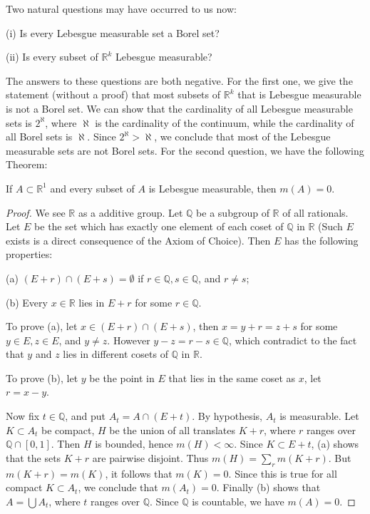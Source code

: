 Two natural questions may have occurred to us now:\par
(i) Is every Lebesgue measurable set a Borel set?\par
(ii) Is every subset of $\mathbb{R}^k$ Lebesgue measurable?\par
The answers to these questions are both negative. For the first one, we give the statement (without a proof) that most subsets of $\mathbb{R}^k$ that is Lebesgue measurable is not a Borel set. We can show that the cardinality of all Lebesgue measurable sets is $2^\aleph$, where $\aleph$ is the cardinality of the continuum, while the cardinality of all Borel sets is $\aleph$. Since $2^\aleph>\aleph$, we conclude that most of the Lebesgue measurable sets are not Borel sets. For the second question, we have the following Theorem:
\begin{theorem}
If $A\subset\mathbb{R}^1$ and every subset of $A$ is Lebesgue measurable, then $m(A)=0$.
\end{theorem}
\begin{proof}
We see $\mathbb{R}$ as a additive group. Let $\mathbb{Q}$ be a subgroup of $\mathbb{R}$ of all rationals. Let $E$ be the set which has exactly one element of each coset of $\mathbb{Q}$ in $\mathbb{R}$ (Such $E$ exists is a direct consequence of the Axiom of Choice). Then $E$ has the following properties:\par
(a) $(E+r)\cap(E+s)=\emptyset$ if $r\in\mathbb{Q},s\in\mathbb{Q}$, and $r\ne s$;\par
(b) Every $x\in\mathbb{R}$ lies in $E+r$ for some $r\in\mathbb{Q}$.\par
To prove (a), let $x\in(E+r)\cap(E+s)$, then $x=y+r=z+s$ for some $y\in E,z\in E$, and $y\ne z$. However $y-z=r-s\in\mathbb{Q}$, which contradict to the fact that $y$ and $z$ lies in different cosets of $\mathbb{Q}$ in $\mathbb{R}$.\par
To prove (b), let $y$ be the point in $E$ that lies in the same coset as $x$, let $r=x-y$.\par
Now fix $t\in\mathbb{Q}$, and put $A_t=A\cap(E+t)$. By hypothesis, $A_t$ is measurable. Let $K\subset A_t$ be compact, $H$ be the union of all translates $K+r$, where $r$ ranges over $\mathbb{Q}\cap[0,1]$. Then $H$ is bounded, hence $m(H)<\infty$. Since $K\subset E+t$, (a) shows that the sets $K+r$ are pairwise disjoint. Thus $m(H)=\sum_rm(K+r)$. But $m(K+r)=m(K)$, it follows that $m(K)=0$. Since this is true for all compact $K\subset A_t$, we conclude that $m(A_t)=0$. Finally (b) shows that $A=\bigcup A_t$, where $t$ ranges over $\mathbb{Q}$. Since $\mathbb{Q}$ is countable, we have $m(A)=0$.
\end{proof}
